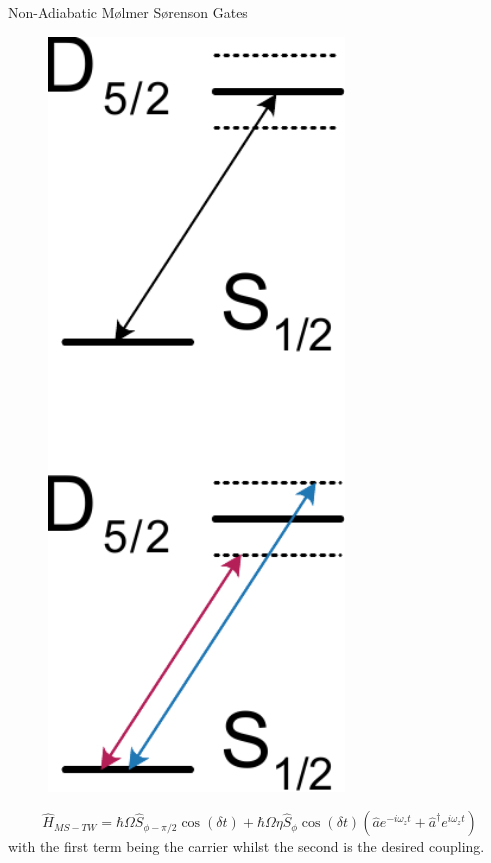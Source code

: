 \documentclass[final]{beamer}
\begin{document}
\begin{frame}{}
\begin{center}
\begin{columns}[t]
\begin{column}{0.49\textwidth}
\begin{alertblock}{Non-Adiabatic Mølmer Sørenson Gates}
\begin{minipage}{0.14\linewidth}
\begin{figure}
        \includegraphics[width=0.7\textwidth]{./figs/level_structure.pdf}
      \end{figure}
      \end{minipage}
      \Large$$ \hat{H}_{MS-TW} = \hbar\Omega \hat{S}_{\phi-\pi/2}\cos{(\delta t)} + \hbar\Omega\eta \hat{S}_\phi\cos{(\delta t)}(\hat{a}e^{-i\omega_zt} + \hat{a}^\dagger e^{i\omega_zt})$$\normalsize
      \vspace{0.4em}
      with the first term being the carrier whilst the second is the desired coupling.

\end{alertblock}
\end{column}
\end{columns}
\end{center}
\end{frame}
\end{document}
